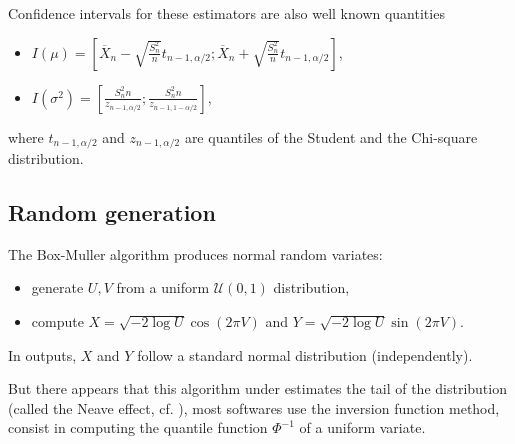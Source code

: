 Confidence intervals for these estimators are also well known quantities
\begin{itemize}
\item $I(\mu) = \left[\overline X_n - \sqrt{\frac{S_n^2}{n}} t_{n-1,\alpha/2}; \overline X_n + \sqrt{\frac{S_n^2}{n}} t_{n-1,\alpha/2}\right]$,
\item $I(\sigma^2) = \left[\frac{S_n^2 n}{ z_{n-1,\alpha/2}}; \frac{S_n^2n}{ z_{n-1,1-\alpha/2}}\right]$,
\end{itemize}
where $t_{n-1,\alpha/2}$ and $z_{n-1,\alpha/2}$ are quantiles of the Student and the Chi-square distribution.

\subsection{Random generation}
The Box-Muller algorithm produces normal random variates:
\begin{itemize}
\item generate $U,V$ from a uniform $\mathcal U(0,1)$ distribution,
\item compute $X = \sqrt{-2\log U} \cos(2\pi V)$ and $Y = \sqrt{-2\log U} \sin(2\pi V)$.
\end{itemize}
In outputs, $X$ and $Y$ follow a standard normal distribution (independently).

But there appears that this algorithm under estimates the tail of the distribution (called the Neave effect, cf. \cite{patard}), most softwares use the inversion function method, consist in computing the quantile function $\Phi^{-1}$ of a uniform variate.


